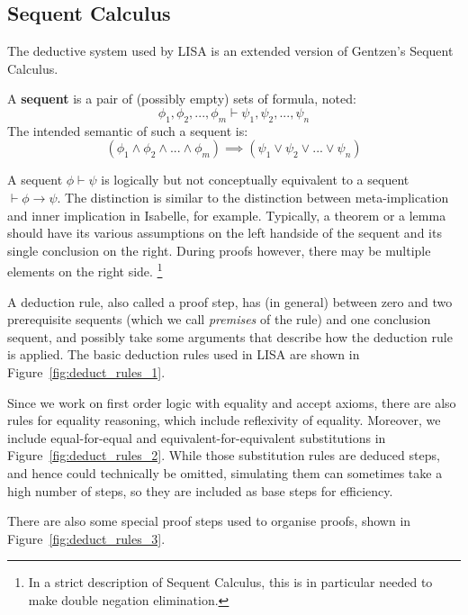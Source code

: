\subsection{Sequent Calculus}
\label{subs:lk}
The deductive system used by LISA is an extended version of Gentzen's Sequent Calculus.
\begin{defin}
  A \textbf{sequent} is a pair of (possibly empty) sets of formula, noted:
  $$\phi_1, \phi_2, ..., \phi_m \vdash \psi_1, \psi_2, ..., \psi_n$$
  The intended semantic of such a sequent is:
  \begin{equation}
    \label{eq:SequentSemantic}
    (\phi_1 \land \phi_2 \land ... \land \phi_m ) \implies (\psi_1 \lor \psi_2 \lor ... \lor \psi_n )
  \end{equation}

\end{defin}
A sequent $\phi \vdash \psi$ is logically but not conceptually equivalent to a sequent $\vdash \phi \rightarrow \psi$. The distinction is similar to the distinction between meta-implication and inner implication in Isabelle, for example. Typically, a theorem or a lemma should have its various assumptions on the left handside of the sequent and its single conclusion on the right. During proofs however, there may be multiple elements on the right side. \footnote{In a strict description of Sequent Calculus, this is in particular needed to make double negation elimination.}

A deduction rule, also called a proof step, has  (in general) between zero and two prerequisite sequents (which we call \textit{premises} of the rule) and one conclusion sequent, and possibly take some arguments that describe how the deduction rule is applied. The basic deduction rules used in LISA are shown in Figure~\ref{fig:deduct_rules_1}.


Since we work on first order logic with equality and accept axioms, there are also rules for equality reasoning, which include reflexivity of equality. Moreover, we include equal-for-equal and equivalent-for-equivalent substitutions in Figure~\ref{fig:deduct_rules_2}. While those substitution rules are deduced steps, and hence could technically be omitted, simulating them can sometimes take a high number of steps, so they are included as base steps for efficiency.

There are also some special proof steps used to organise proofs, shown in Figure~\ref{fig:deduct_rules_3}.

